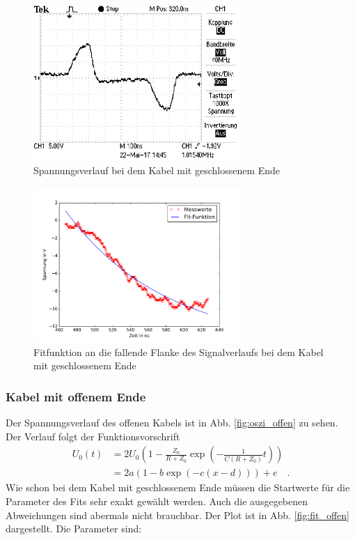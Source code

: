 \begin{figure}
	\centering
	\includegraphics[width=0.7\textwidth]{Laplace/geschlossen.pdf}
\caption{Spannungsverlauf bei dem Kabel mit geschlossenem Ende}
\label{fig:oszi_geschlossen}
\end{figure}

\begin{figure}
	\centering
	\includegraphics[width=0.7\textwidth]{Laplace/geschlossenes_ende.pdf}
	\caption{Fitfunktion an die fallende Flanke des Signalverlaufs bei dem Kabel mit geschlossenem Ende}
\label{fig:fit_geschlossen}
\end{figure}

\clearpage
\subsubsection{Kabel mit offenem Ende}\label{sec:impedanz}
Der Spannungsverlauf des offenen Kabels ist in  Abb. \ref{fig:oszi_offen} zu sehen. Der Verlauf folgt der Funktionsvorschrift
\begin{align}
	U_0(t) &= 2U_0\left(1 -  \frac{Z_0}{R+Z_0} \exp \left( - \frac{1}{C(R+Z_0)} t\right) \right)\\
	&=  2 a (1 - b \exp(-c (x-d))) + e \quad .
\end{align}
Wie schon bei dem Kabel mit geschlossenem Ende müssen die Startwerte für die Parameter des Fits sehr exakt gewählt werden. Auch die ausgegebenen Abweichungen sind abermals nicht brauchbar. Der Plot ist in Abb. \ref{fig:fit_offen} dargestellt. Die Parameter sind:

